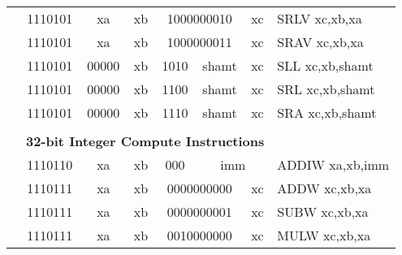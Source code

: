 \begin{table}[p]
\begin{small}
\begin{center}
\begin{tabular}{rcccccccccl}
&
\multicolumn{2}{|c|}{1110101} &
\multicolumn{1}{c|}{xa} &
\multicolumn{1}{c|}{xb} &
\multicolumn{4}{c|}{1000000010} &
\multicolumn{1}{c|}{xc} & SRLV xc,xb,xa \\
\cline{2-10}
  

&
\multicolumn{2}{|c|}{1110101} &
\multicolumn{1}{c|}{xa} &
\multicolumn{1}{c|}{xb} &
\multicolumn{4}{c|}{1000000011} &
\multicolumn{1}{c|}{xc} & SRAV xc,xb,xa \\
\cline{2-10}
  

&
\multicolumn{2}{|c|}{1110101} &
\multicolumn{1}{c|}{00000} &
\multicolumn{1}{c|}{xb} &
\multicolumn{2}{c|}{1010} &
\multicolumn{2}{c|}{shamt} &
\multicolumn{1}{c|}{xc} & SLL xc,xb,shamt \\
\cline{2-10}
  

&
\multicolumn{2}{|c|}{1110101} &
\multicolumn{1}{c|}{00000} &
\multicolumn{1}{c|}{xb} &
\multicolumn{2}{c|}{1100} &
\multicolumn{2}{c|}{shamt} &
\multicolumn{1}{c|}{xc} & SRL xc,xb,shamt \\
\cline{2-10}
  

&
\multicolumn{2}{|c|}{1110101} &
\multicolumn{1}{c|}{00000} &
\multicolumn{1}{c|}{xb} &
\multicolumn{2}{c|}{1110} &
\multicolumn{2}{c|}{shamt} &
\multicolumn{1}{c|}{xc} & SRA xc,xb,shamt \\
\cline{2-10}
  

&
\multicolumn{9}{c}{} & \\
&
\multicolumn{9}{c}{\bf 32-bit Integer Compute Instructions} & \\
\cline{2-10}
  

&
\multicolumn{2}{|c|}{1110110} &
\multicolumn{1}{c|}{xa} &
\multicolumn{1}{c|}{xb} &
\multicolumn{1}{c|}{000} &
\multicolumn{4}{c|}{imm} & ADDIW xa,xb,imm \\
\cline{2-10}
  

&
\multicolumn{2}{|c|}{1110111} &
\multicolumn{1}{c|}{xa} &
\multicolumn{1}{c|}{xb} &
\multicolumn{4}{c|}{0000000000} &
\multicolumn{1}{c|}{xc} & ADDW xc,xb,xa \\
\cline{2-10}
  

&
\multicolumn{2}{|c|}{1110111} &
\multicolumn{1}{c|}{xa} &
\multicolumn{1}{c|}{xb} &
\multicolumn{4}{c|}{0000000001} &
\multicolumn{1}{c|}{xc} & SUBW xc,xb,xa \\
\cline{2-10}
  

&
\multicolumn{2}{|c|}{1110111} &
\multicolumn{1}{c|}{xa} &
\multicolumn{1}{c|}{xb} &
\multicolumn{4}{c|}{0010000000} &
\multicolumn{1}{c|}{xc} & MULW xc,xb,xa \\
\cline{2-10}
  


\end{tabular}
\end{center}
\end{small}
\end{table}
